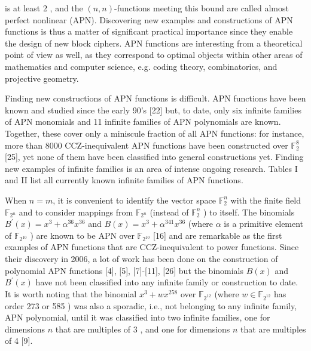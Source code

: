 \documentclass[10pt]{article}
\begin{document}
is at least 2 , and the $(n, n)$-functions meeting this bound are called almost perfect nonlinear (APN). Discovering new examples and constructions of APN functions is thus a matter of significant practical importance since they enable the design of new block ciphers. APN functions are interesting from a theoretical point of view as well, as they correspond to optimal objects within other areas of mathematics and computer science, e.g. coding theory, combinatorics, and projective geometry.

Finding new constructions of APN functions is difficult. APN functions have been known and studied since the early 90's [22] but, to date, only six infinite families of APN monomials and 11 infinite families of APN polynomials are known. Together, these cover only a miniscule fraction of all APN functions: for instance, more than 8000 CCZ-inequivalent APN functions have been constructed over $\mathbb{F}_{2}^{8}$ [25], yet none of them have been classified into general constructions yet. Finding new examples of infinite families is an area of intense ongoing research. Tables I and II list all currently known infinite families of APN functions.

When $n=m$, it is convenient to identify the vector space $\mathbb{F}_{2}^{n}$ with the finite field $\mathbb{F}_{2^{n}}$ and to consider mappings from $\mathbb{F}_{2^{n}}$ (instead of $\mathbb{F}_{2}^{n}$ ) to itself. The binomials $B^{\prime}(x)=x^{3}+\alpha^{36} x^{36}$ and $B(x)=x^{3}+\alpha^{341} x^{36}$ (where $\alpha$ is a primitive element of $\mathbb{F}_{2^{10}}$ ) are known to be APN over $\mathbb{F}_{2^{10}}$ [16] and are remarkable as the first examples of APN functions that are CCZ-inequivalent to power functions. Since their discovery in 2006, a lot of work has been done on the construction of polynomial APN functions [4], [5], [7]-[11], [26] but the binomials $B(x)$ and $B^{\prime}(x)$ have not been classified into any infinite family or construction to date. It is worth noting that the binomial $x^{3}+w x^{258}$ over $\mathbb{F}_{2^{12}}$ (where $w \in \mathbb{F}_{2^{12}}$ has order 273 or 585 ) was also a sporadic, i.e., not belonging to any infinite family, APN polynomial, until it was classified into two infinite families, one for dimensions $n$ that are multiples of 3 , and one for dimensions $n$ that are multiples of 4 [9].
\end{document}
